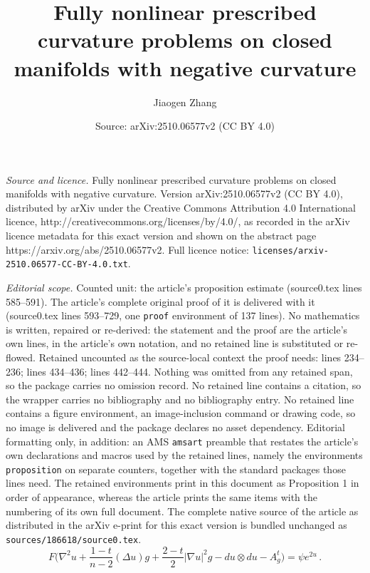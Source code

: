 \documentclass[10pt,a4paper]{amsart}
\title{Fully nonlinear prescribed curvature problems on closed manifolds with negative curvature}
\author{Jiaogen Zhang}
\date{Source: arXiv:2510.06577v2 (CC BY 4.0)}
\begin{document}
\maketitle

\noindent\emph{Source and licence.} Fully nonlinear prescribed curvature problems on closed manifolds with negative curvature. Version arXiv:2510.06577v2 (CC BY 4.0), distributed by arXiv under the Creative Commons Attribution 4.0 International licence, http://creativecommons.org/licenses/by/4.0/, as recorded in the arXiv licence metadata for this exact version and shown on the abstract page https://arxiv.org/abs/2510.06577v2. Full licence notice: \texttt{licenses/arxiv-2510.06577-CC-BY-4.0.txt}.\par\smallskip

\noindent\textit{Editorial scope.} Counted unit: the article's proposition estimate (source0.tex lines 585--591). The article's complete original proof of it is delivered with it (source0.tex lines 593--729, one \texttt{proof} environment of 137 lines). No mathematics is written, repaired or re-derived: the statement and the proof are the article's own lines, in the article's own notation, and no retained line is substituted or re-flowed.  Retained uncounted as the source-local context the proof needs: lines 234--236; lines 434--436; lines 442--444.  Nothing was omitted from any retained span, so the package carries no omission record.  No retained line contains a citation, so the wrapper carries no bibliography and no bibliography entry.  No retained line contains a figure environment, an image-inclusion command or drawing code, so no image is delivered and the package declares no asset dependency.  Editorial formatting only, in addition: an AMS \texttt{amsart} preamble that restates the article's own declarations and macros used by the retained lines, namely the environments \texttt{proposition} on separate counters, together with the standard packages those lines need.  The retained environments print in this document as Proposition 1 in order of appearance, whereas the article prints the same items with the numbering of its own full document.  The complete native source of the article as distributed in the arXiv e-print for this exact version is bundled unchanged as \texttt{sources/186618/source0.tex}.
\begin{equation}\label{scalar curvature problem}
F\Big(\nabla^2u+\frac{1-t}{n-2}(\Delta u)g+\frac{2-t}{2}|\nabla u|^2g-du\otimes du-A^{t}_{g}\Big)=\psi e^{2u}\,.
\end{equation}
\end{document}
